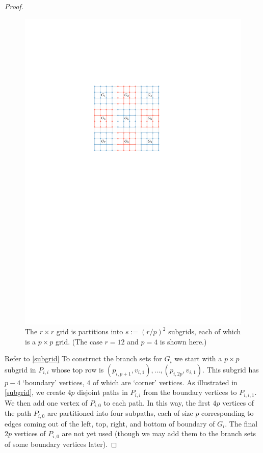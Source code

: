 \documentclass[kpfonts,lotsofwhite]{patmorin}
\theoremstyle{plain}
\theoremstyle{definition}
\begin{document}
\begin{proof}
  \begin{figure}
    \begin{center}
      \includegraphics{gridlayout}
    \end{center}
    \caption{The $r\times r$ grid is partitions into $s:=(r/p)^2$ subgrids, each of which is a $p\times p$ grid. (The case $r=12$ and $p=4$ is shown here.)}
    \label{grid_partition}
  \end{figure}

  Refer to \cref{subgrid}   To construct the branch sets for $G_i$ we start with a $p\times p$ subgrid in $P_{i,i}$ whose top row is $(p_{i,p+1},v_{i,1}),\ldots,(p_{i,2p},v_{i,1})$.  This subgrid has $p-4$ `boundary' vertices, $4$ of which are `corner' vertices. As illustrated in \cref{subgrid}, we create $4p$ disjoint paths in $P_{i,i}$ from the boundary vertices to $P_{i,i,1}$.  We then add one vertex of $P_{i,0}$ to each path.  In this way, the first $4p$ vertices of the path $P_{i,0}$ are partitioned into four subpaths, each of size $p$ corresponding to edges coming out of the left, top, right, and bottom of boundary of $G_i$.  The final $2p$ vertices of $P_{i,0}$ are not yet used (though we may add them to the branch sets of some boundary vertices later).


\end{proof}
\end{document}
